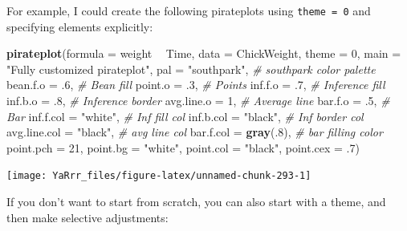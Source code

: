 \documentclass[]{book}
\newenvironment{Shaded}{\begin{snugshade}}{\end{snugshade}}
\newcommand{\KeywordTok}[1]{\textcolor[rgb]{0.13,0.29,0.53}{\textbf{#1}}}
\newcommand{\DataTypeTok}[1]{\textcolor[rgb]{0.13,0.29,0.53}{#1}}
\newcommand{\DecValTok}[1]{\textcolor[rgb]{0.00,0.00,0.81}{#1}}
\newcommand{\StringTok}[1]{\textcolor[rgb]{0.31,0.60,0.02}{#1}}
\newcommand{\CommentTok}[1]{\textcolor[rgb]{0.56,0.35,0.01}{\textit{#1}}}
\newcommand{\OperatorTok}[1]{\textcolor[rgb]{0.81,0.36,0.00}{\textbf{#1}}}
\newcommand{\NormalTok}[1]{#1}
\theoremstyle{definition}
\theoremstyle{definition}
\theoremstyle{remark}
\begin{document}
For example, I could create the following pirateplots using
\texttt{theme\ =\ 0} and specifying elements explicitly:

\begin{Shaded}
\begin{Highlighting}[]
\KeywordTok{pirateplot}\NormalTok{(}\DataTypeTok{formula =}\NormalTok{ weight }\OperatorTok{~}\StringTok{ }\NormalTok{Time,}
           \DataTypeTok{data =}\NormalTok{ ChickWeight,}
           \DataTypeTok{theme =} \DecValTok{0}\NormalTok{,}
           \DataTypeTok{main =} \StringTok{"Fully customized pirateplot"}\NormalTok{,}
           \DataTypeTok{pal =} \StringTok{"southpark"}\NormalTok{, }\CommentTok{# southpark color palette}
           \DataTypeTok{bean.f.o =}\NormalTok{ .}\DecValTok{6}\NormalTok{, }\CommentTok{# Bean fill}
           \DataTypeTok{point.o =}\NormalTok{ .}\DecValTok{3}\NormalTok{, }\CommentTok{# Points}
           \DataTypeTok{inf.f.o =}\NormalTok{ .}\DecValTok{7}\NormalTok{, }\CommentTok{# Inference fill}
           \DataTypeTok{inf.b.o =}\NormalTok{ .}\DecValTok{8}\NormalTok{, }\CommentTok{# Inference border}
           \DataTypeTok{avg.line.o =} \DecValTok{1}\NormalTok{, }\CommentTok{# Average line}
           \DataTypeTok{bar.f.o =}\NormalTok{ .}\DecValTok{5}\NormalTok{, }\CommentTok{# Bar}
           \DataTypeTok{inf.f.col =} \StringTok{"white"}\NormalTok{, }\CommentTok{# Inf fill col}
           \DataTypeTok{inf.b.col =} \StringTok{"black"}\NormalTok{, }\CommentTok{# Inf border col}
           \DataTypeTok{avg.line.col =} \StringTok{"black"}\NormalTok{, }\CommentTok{# avg line col}
           \DataTypeTok{bar.f.col =} \KeywordTok{gray}\NormalTok{(.}\DecValTok{8}\NormalTok{), }\CommentTok{# bar filling color}
           \DataTypeTok{point.pch =} \DecValTok{21}\NormalTok{,}
           \DataTypeTok{point.bg =} \StringTok{"white"}\NormalTok{,}
           \DataTypeTok{point.col =} \StringTok{"black"}\NormalTok{,}
           \DataTypeTok{point.cex =}\NormalTok{ .}\DecValTok{7}\NormalTok{)}
\end{Highlighting}
\end{Shaded}

\begin{center}\texttt{[image: YaRrr\_files/figure-latex/unnamed-chunk-293-1]} \end{center}

If you don't want to start from scratch, you can also start with a
theme, and then make selective adjustments:
\end{document}
